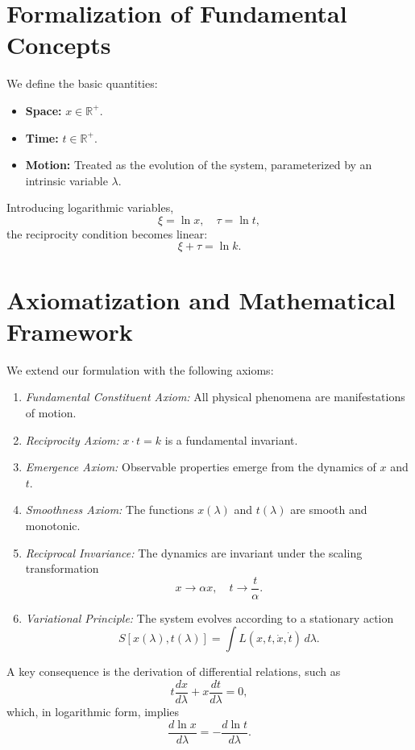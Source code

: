 \documentclass{article}
\begin{document}
\section{Formalization of Fundamental Concepts}
We define the basic quantities:
\begin{itemize}
    \item \textbf{Space:} \(x \in \mathbb{R}^+\).
    \item \textbf{Time:} \(t \in \mathbb{R}^+\).
    \item \textbf{Motion:} Treated as the evolution of the system, parameterized by an intrinsic variable \(\lambda\).
\end{itemize}
Introducing logarithmic variables,
\[
\xi = \ln x, \quad \tau = \ln t,
\]
the reciprocity condition becomes linear:
\[
\xi + \tau = \ln k.
\]

\section{Axiomatization and Mathematical Framework}
We extend our formulation with the following axioms:
\begin{enumerate}
    \item \emph{Fundamental Constituent Axiom:} All physical phenomena are manifestations of motion.
    \item \emph{Reciprocity Axiom:} \(x \cdot t = k\) is a fundamental invariant.
    \item \emph{Emergence Axiom:} Observable properties emerge from the dynamics of \(x\) and \(t\).
    \item \emph{Smoothness Axiom:} The functions \(x(\lambda)\) and \(t(\lambda)\) are smooth and monotonic.
    \item \emph{Reciprocal Invariance:} The dynamics are invariant under the scaling transformation
    \[
    x \to \alpha x,\quad t \to \frac{t}{\alpha}.
    \]
    \item \emph{Variational Principle:} The system evolves according to a stationary action
    \[
    S[x(\lambda),t(\lambda)] = \int L(x,t,\dot{x},\dot{t})\,d\lambda.
    \]
\end{enumerate}
A key consequence is the derivation of differential relations, such as
\[
t \frac{dx}{d\lambda} + x \frac{dt}{d\lambda} = 0,
\]
which, in logarithmic form, implies
\[
\frac{d\ln x}{d\lambda} = -\frac{d\ln t}{d\lambda}.
\]
\end{document}
